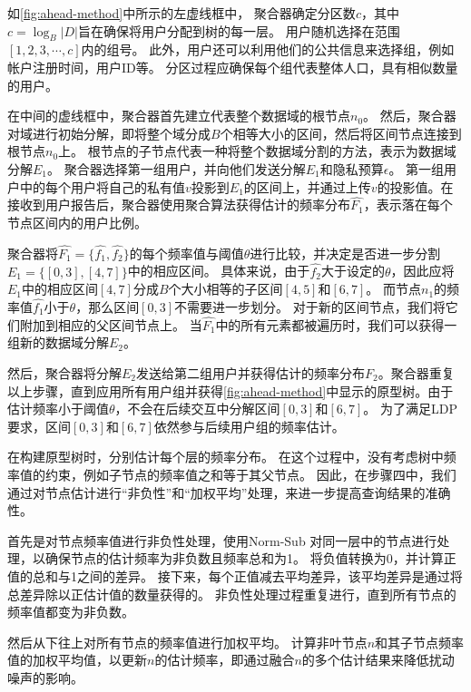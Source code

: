 如\autoref{fig:ahead-method}中所示的左虚线框中，
聚合器确定分区数$c$，其中$c=\log_B|D|$旨在确保将用户分配到\myahead 树的每一层。
用户随机选择在范围$[1,2,3,\cdots,c]$内的组号。
此外，用户还可以利用他们的公共信息来选择组，例如帐户注册时间，用户ID等。
分区过程应确保每个组代表整体人口，具有相似数量的用户。

在中间的虚线框中，聚合器首先建立代表整个数据域的根节点$n_0$。
然后，聚合器对域进行初始分解，即将整个域分成$B$个相等大小的区间，然后将区间节点连接到根节点$n_0$上。
根节点的子节点代表一种将整个数据域分割的方法，表示为数据域分解$E_1$。
聚合器选择第一组用户，并向他们发送分解$E_1$和隐私预算$\epsilon$。
第一组用户中的每个用户将自己的私有值$v$投影到$E_1$的区间上，并通过\oue 上传$v$的投影值。在接收到用户报告后，聚合器使用聚合算法获得估计的频率分布$\hat{F_1}$，表示落在每个节点区间内的用户比例。

聚合器将$\hat{F_1}=\{\hat{f_1}, \hat{f_2}\}$的每个频率值与阈值$\theta$进行比较，并决定是否进一步分割$E_1=\{[0,3], [4,7]\}$中的相应区间。
具体来说，由于$\hat{f_2}$大于设定的$\theta$，因此应将$E_1$中的相应区间$[4,7]$分成$B$个大小相等的子区间$[4,5]$和$[6,7]$。
而节点$n_1$的频率值$\hat{f_1}$小于$\theta$，那么区间$[0,3]$不需要进一步划分。
对于新的区间节点，我们将它们附加到相应的父区间节点上。
当$\hat{F_1}$中的所有元素都被遍历时，我们可以获得一组新的数据域分解$E_{2}$。

然后，聚合器将分解$E_{2}$发送给第二组用户并获得估计的频率分布$F_2$。聚合器重复以上步骤，直到应用所有用户组并获得\autoref{fig:ahead-method}中显示的\myahead 原型树。由于估计频率小于阈值$\theta$，\myahead 不会在后续交互中分解区间$[0,3]$和$[6,7]$。
为了满足LDP要求，区间$[0,3]$和$[6,7]$依然参与后续用户组的频率估计。

在构建原型树时，\myahead 分别估计每个层的频率分布。
在这个过程中，\myahead 没有考虑树中频率值的约束，例如子节点的频率值之和等于其父节点。
因此，在步骤四中，我们通过对节点估计进行“非负性”和“加权平均”处理，来进一步提高\myahead 查询结果的准确性。

首先是对节点频率值进行非负性处理，\myahead 使用Norm-Sub \cite{wang2019consistent}对同一层中的节点进行处理，以确保节点的估计频率为非负数且频率总和为1。
\myahead 将负值转换为0，并计算正值的总和与1之间的差异。
接下来，每个正值减去平均差异，该平均差异是通过将总差异除以正估计值的数量获得的。
非负性处理过程重复进行，直到所有节点的频率值都变为非负数。

然后\myahead 从下往上对所有节点的频率值进行加权平均。
\myahead 计算非叶节点$n$和其子节点频率值的加权平均值，以更新$n$的估计频率，即通过融合$n$的多个估计结果来降低扰动噪声的影响。

